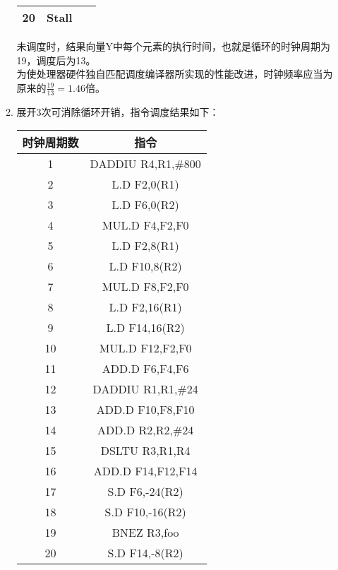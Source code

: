 \documentclass{article}
\begin{document}
\begin{enumerate}[label=\arabic*.]
\begin{enumerate}[label=\alph*.]
\begin{table}[H]
\begin{tabular}{ccc}
                    20 & Stall & ~ \\
                    \hline
                \end{tabular}
            \end{table}
            未调度时，结果向量Y中每个元素的执行时间，也就是循环的时钟周期为19，调度后为13。\\
            为使处理器硬件独自匹配调度编译器所实现的性能改进，时钟频率应当为原来的$\frac{19}{13} = 1.46$倍。
            \item 展开3次可消除循环开销，指令调度结果如下：\\
            \begin{table}[H]
                \centering
                \begin{tabular}{cc}
                    \hline
                    时钟周期数 & 指令 \\
                    \hline
                    1 & DADDIU R4,R1,\#800 \\
                    2 & L.D F2,0(R1) \\
                    3 & L.D F6,0(R2) \\
                    4 & MUL.D F4,F2,F0 \\
                    5 & L.D F2,8(R1) \\
                    6 & L.D F10,8(R2) \\
                    7 & MUL.D F8,F2,F0 \\
                    8 & L.D F2,16(R1) \\
                    9 & L.D F14,16(R2) \\
                    10 & MUL.D F12,F2,F0 \\
                    11 & ADD.D F6,F4,F6 \\
                    12 & DADDIU R1,R1,\#24 \\
                    13 & ADD.D F10,F8,F10 \\
                    14 & ADD.D R2,R2,\#24 \\
                    15 & DSLTU R3,R1,R4 \\
                    16 & ADD.D F14,F12,F14 \\
                    17 & S.D F6,-24(R2) \\
                    18 & S.D F10,-16(R2) \\
                    19 & BNEZ R3,foo \\
                    20 & S.D F14,-8(R2) \\
                    \hline

\end{tabular}
\end{table}
\end{enumerate}
\end{enumerate}
\end{document}
